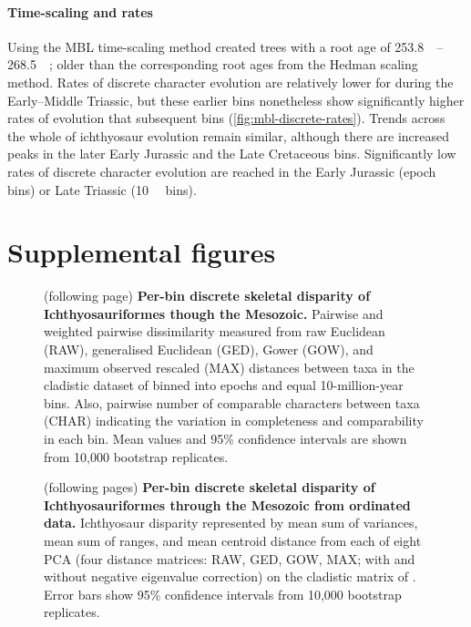 \documentclass[british,a4paper]{article}
\makeatletter
\renewcommand\listoffigures{%
	    \@starttoc{lof}%
    }
\newcommand\pcref[1]{(\cref{#1})}
\makeatother
\begin{document}
\paragraph{Time-scaling and rates}\label{par:mbl-scaling-rates}

Using the MBL time-scaling method created trees with a root age of
\SIrange{253.8}{268.5}{\mega\annum}; older than the corresponding root ages from
the Hedman scaling method. Rates of discrete character evolution are relatively
lower for during the Early–Middle Triassic, but these earlier bins nonetheless
show significantly higher rates of evolution that subsequent bins
\pcref{fig:mbl-discrete-rates}. Trends across the whole of ichthyosaur evolution
remain similar, although there are increased peaks in the later Early Jurassic
and the Late Cretaceous bins. Significantly low rates of discrete character
evolution are reached in the Early Jurassic (epoch bins) or Late Triassic
(\SI{10}{\mega\annum} bins).



\section{Supplemental figures}\label{sec:supplemental-figures}

\listoffigures

\begin{figure}[h]
    \caption[Per-bin discrete skeletal disparity of Ichthyosauriformes though
    the Mesozoic]{(following page) \textbf{Per-bin discrete skeletal disparity
    of Ichthyosauriformes though the Mesozoic.} Pairwise and weighted
    pairwise dissimilarity measured from raw Euclidean (RAW), generalised
    Euclidean (GED), Gower (GOW), and maximum observed rescaled (MAX)
    distances between taxa in the cladistic dataset of \textcite{Moon2018JSP}
    binned into epochs and equal 10-million-year bins. Also, pairwise number
    of comparable characters between taxa (CHAR) indicating the variation in
    completeness and comparability in each bin. Mean values and 95\%
    confidence intervals are shown from 10,000 bootstrap
    replicates.\label{fig:pairwise-disparity}}
\end{figure}
\FloatBarrier



\begin{figure}[h]
    \caption[Per-bin discrete skeletal disparity of Ichthyosauriformes through
    the Mesozoic from ordinated data]{(following pages) \textbf{Per-bin discrete
    skeletal disparity of Ichthyosauriformes through the Mesozoic from ordinated
    data.} Ichthyosaur disparity represented by mean sum of variances, mean sum
    of ranges, and mean centroid distance from each of eight PCA (four distance
    matrices: RAW, GED, GOW, MAX\@; with and without negative eigenvalue correction)
    on the cladistic matrix of \textcite{Moon2018JSP}. Error bars show 95\% confidence
    intervals from 10,000 bootstrap replicates.\label{fig:ordinated-disparity}}
\end{figure}
\FloatBarrier
\end{document}
